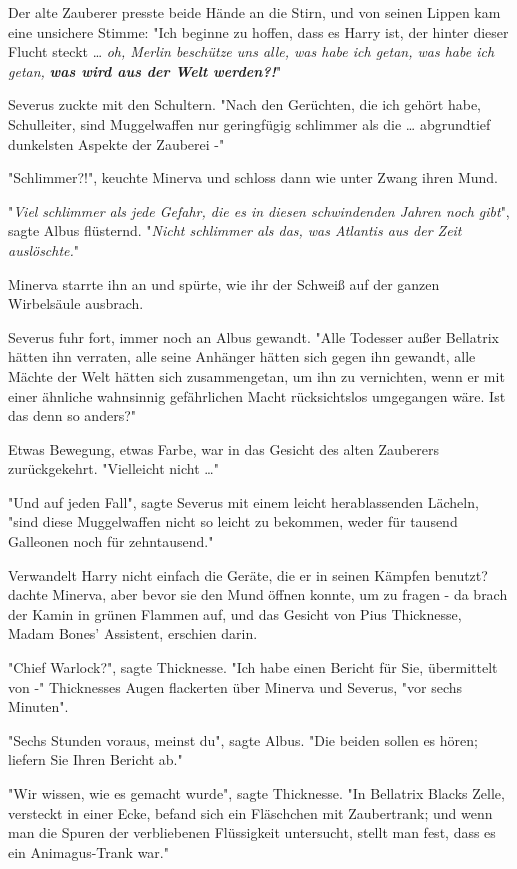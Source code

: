 {Der alte Zauberer presste beide Hände an die Stirn, und von seinen Lippen kam eine unsichere Stimme: "Ich beginne zu hoffen, dass es Harry ist, der hinter dieser Flucht steckt … \emph{oh, Merlin beschütze uns alle, was habe ich getan, was habe ich getan,} \textbf{\emph{was wird aus der Welt werden?!}}"

Severus zuckte mit den Schultern. "Nach den Gerüchten, die ich gehört habe, Schulleiter, sind Muggelwaffen nur geringfügig schlimmer als die … abgrundtief dunkelsten Aspekte der Zauberei -"

"Schlimmer?!", keuchte Minerva und schloss dann wie unter Zwang ihren Mund.

"\emph{Viel} \emph{schlimmer als jede Gefahr, die es in diesen schwindenden Jahren noch gibt}", sagte Albus flüsternd. "\emph{Nicht schlimmer als das, was Atlantis aus der Zeit auslöschte.}"

Minerva starrte ihn an und spürte, wie ihr der Schweiß auf der ganzen Wirbelsäule ausbrach.

Severus fuhr fort, immer noch an Albus gewandt. "Alle Todesser außer Bellatrix hätten ihn verraten, alle seine Anhänger hätten sich gegen ihn gewandt, alle Mächte der Welt hätten sich zusammengetan, um ihn zu vernichten, wenn er mit einer ähnliche wahnsinnig gefährlichen Macht rücksichtslos umgegangen wäre. Ist das denn so anders?"

Etwas Bewegung, etwas Farbe, war in das Gesicht des alten Zauberers zurückgekehrt. "Vielleicht nicht …"

"Und auf jeden Fall", sagte Severus mit einem leicht herablassenden Lächeln, "sind diese Muggelwaffen nicht so leicht zu bekommen, weder für tausend Galleonen noch für zehntausend."

Verwandelt Harry nicht einfach die Geräte, die er in seinen Kämpfen benutzt? dachte Minerva, aber bevor sie den Mund öffnen konnte, um zu fragen - da brach der Kamin in grünen Flammen auf, und das Gesicht von Pius Thicknesse, Madam Bones' Assistent, erschien darin.

"Chief Warlock?", sagte Thicknesse. "Ich habe einen Bericht für Sie, übermittelt von -" Thicknesses Augen flackerten über Minerva und Severus, "vor sechs Minuten".

"Sechs Stunden voraus, meinst du", sagte Albus. "Die beiden sollen es hören; liefern Sie Ihren Bericht ab."

"Wir wissen, wie es gemacht wurde", sagte Thicknesse. "In Bellatrix Blacks Zelle, versteckt in einer Ecke, befand sich ein Fläschchen mit Zaubertrank; und wenn man die Spuren der verbliebenen Flüssigkeit untersucht, stellt man fest, dass es ein Animagus-Trank war."

}

